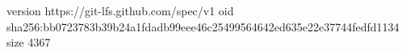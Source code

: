 version https://git-lfs.github.com/spec/v1
oid sha256:bb0723783b39b24a1fdadb99eee46c25499564642ed635e22e37744fedfd1134
size 4367
